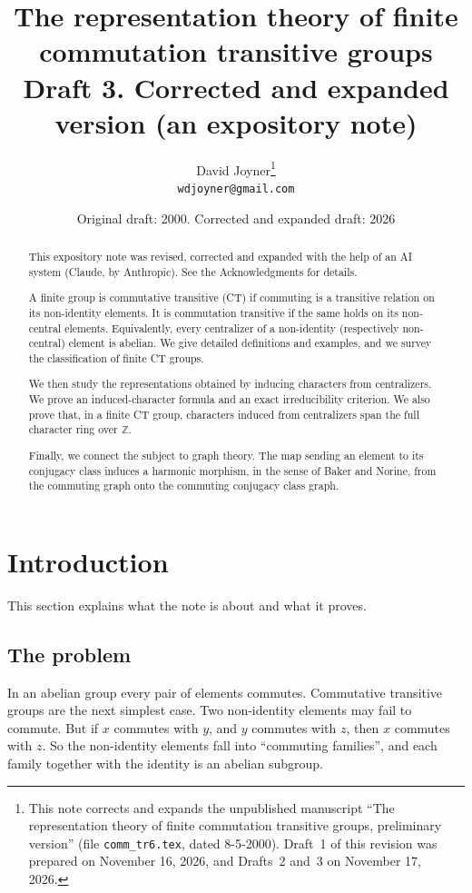 \documentclass[12pt,letterpaper]{article}
\title{The representation theory of finite commutation transitive groups\\[4pt]
\large Draft 3. Corrected and expanded version (an expository note)}
\author{David Joyner\thanks{This note corrects and expands the unpublished
manuscript ``The representation theory of finite commutation transitive
groups, preliminary version'' (file \texttt{comm\_tr6.tex}, dated 8-5-2000).
Draft~1 of this revision was prepared on November 16, 2026, and Drafts~2
and~3 on November 17, 2026.}\\
\texttt{wdjoyner@gmail.com}}
\date{Original draft: 2000. Corrected and expanded draft: 2026}
\numberwithin{equation}{section}
\theoremstyle{plain}
\theoremstyle{definition}
\newcommand{\Z}{\mathbb{Z}}
\begin{document}
\maketitle

\begin{abstract}
This expository note was revised, corrected and expanded with the help of
an AI system (Claude, by Anthropic). See the Acknowledgments for details.

A finite group is commutative transitive (CT) if commuting is a transitive
relation on its non-identity elements. It is commutation transitive if the
same holds on its non-central elements. Equivalently, every centralizer of a
non-identity (respectively non-central) element is abelian.
We give detailed
definitions and examples, and we survey the classification of finite CT
groups.

We then study the representations obtained by inducing characters
from centralizers. We prove an induced-character formula and an
exact irreducibility criterion. We also prove that, in a finite CT group,
characters induced from centralizers span the full character ring over
$\Z$.

Finally, we connect the subject to graph theory. The map sending an
element to its conjugacy class induces a harmonic morphism, in the sense of Baker
and Norine, from the commuting graph onto the commuting conjugacy class
graph. 
\end{abstract}

\tableofcontents

\section{Introduction}\label{sec:intro}

This section explains what the note is about and what it proves.

\subsection{The problem}

In an abelian group every pair of elements commutes. Commutative
transitive groups are the next simplest case. Two non-identity elements may
fail to commute. But if $x$ commutes with $y$, and $y$ commutes with $z$,
then $x$ commutes with $z$. So the non-identity elements fall into
``commuting families'', and each family together with the identity is an
abelian subgroup.
\end{document}
